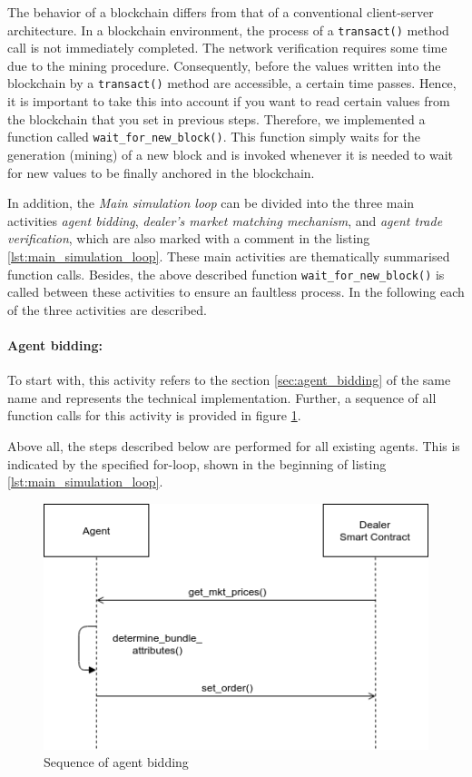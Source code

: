 The behavior of a blockchain differs from that of a conventional client-server architecture.
In a blockchain environment, the process of a \verb|transact()| method call is not immediately completed.
The network verification requires some time due to the mining procedure. 
Consequently, before the values written into the blockchain by a \verb|transact()| method are accessible, a certain time passes.
Hence, it is important to take this into account if you want to read certain values 
from the blockchain that you set in previous steps. 
Therefore, we implemented a function called \verb|wait_for_new_block()|. This function
simply waits for the generation (mining) of a new block and 
is invoked whenever it is needed to wait for new values to be finally anchored in the blockchain.

In addition, the \textit{Main simulation loop} can be divided into the three main activities 
\textit{agent bidding}, \textit{dealer's market matching mechanism}, and \textit{agent trade verification},
which are also marked with a comment in the listing \ref{lst:main_simulation_loop}.
These main activities are thematically summarised function calls.
Besides, the above described function \verb|wait_for_new_block()| is called between these activities
to ensure an faultless process. 
In the following each of the three activities are described.

\paragraph{Agent bidding:}
To start with, this activity refers to the section \ref{sec:agent_bidding} of the same name and represents
the technical implementation. Further, a sequence of all function 
calls for this activity is provided in figure \ref{figure:agent_bidding_figure}.

Above all, the steps described below are performed for all existing agents. 
This is indicated by the specified for-loop, shown in the beginning of listing \ref{lst:main_simulation_loop}.

\begin{figure}[htbp]
	\centering
	\includegraphics[width=.8\linewidth]{./figures/agent_bidding.png}
	\caption{Sequence of agent bidding}
	\label{figure:agent_bidding_figure}
\end{figure}

